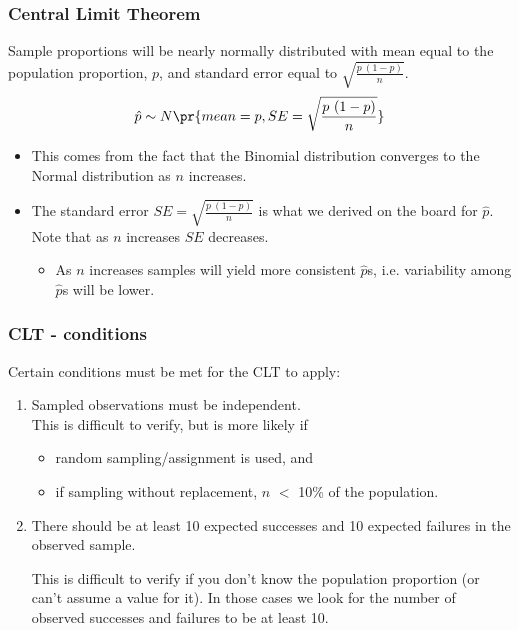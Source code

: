 \documentclass[t,compress,mathserif]{beamer}
\begin{document}
\begin{frame}
\frametitle{Central Limit Theorem}

{Sample proportions will be nearly normally distributed with mean equal to the population proportion, $p$, and standard error equal to $\sqrt{\frac{p~(1-p)}{n}}$.
\[ \hat{p} \sim N \pr{ mean = p, SE = \sqrt{\frac{p~(1-p)}{n}} } \]
}

\begin{itemize}

\item This comes from the fact that the Binomial distribution converges to the Normal distribution as $n$ increases.
\item The standard error $SE =  \sqrt{\frac{p~(1-p)}{n}}$ is what we derived on the board for $\hat{p}$. Note that as $n$ increases $SE$ decreases.
\begin{itemize}
\item As $n$ increases samples will yield more consistent $\hat{p}$s, i.e. variability among $\hat{p}$s will be lower.
\end{itemize}

\end{itemize}

\end{frame}


\begin{frame}
\frametitle{CLT - conditions}

Certain conditions must be met for the CLT to apply:

\begin{enumerate}

\item {} Sampled observations must be independent. \\

This is difficult to verify, but is more likely if
\begin{itemize}
\item random sampling/assignment is used, and
\item if sampling without replacement, $n$ $<$ 10\% of the population.
\end{itemize}

\pause

\item {} There should be at least 10 expected successes and 10 expected failures in the observed sample.

This is difficult to verify if you don't know the population proportion (or can't assume a value for it). In those cases we look for the number of observed successes and failures to be at least 10.

\end{enumerate}

\end{frame}
\end{document}
